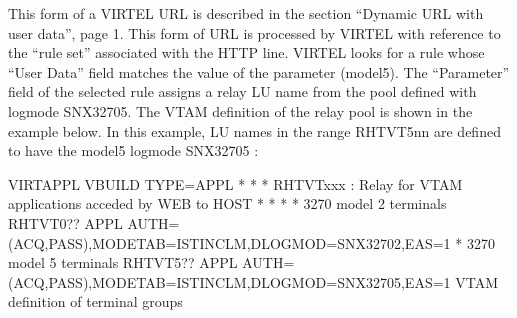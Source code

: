 \documentclass[letterpaper,10pt,english]{sphinxmanual}
\begin{document}
\begin{sphinxVerbatim}[commandchars=\\\{\}]
\end{sphinxVerbatim}

\sphinxAtStartPar
This form of a VIRTEL URL is described in the section “Dynamic URL with user data”, page 1. This form of URL is processed by VIRTEL with reference to the “rule set” associated with the HTTP line. VIRTEL looks for a rule whose “User Data” field matches the value of the parameter (model5). The “Parameter” field of the selected rule assigns a relay LU name from the pool defined with logmode SNX32705. The VTAM definition of the relay pool is shown in the example below. In this example, LU names in the range RHTVT5nn are defined to have the
model5 logmode SNX32705 :\sphinxhyphen{}

\begin{sphinxVerbatim}[commandchars=\\\{\}]
VIRTAPPL VBUILD TYPE=APPL
* \PYGZhy{}\PYGZhy{}\PYGZhy{}\PYGZhy{}\PYGZhy{}\PYGZhy{}\PYGZhy{}\PYGZhy{}\PYGZhy{}\PYGZhy{}\PYGZhy{}\PYGZhy{}\PYGZhy{}\PYGZhy{}\PYGZhy{}\PYGZhy{}\PYGZhy{}\PYGZhy{}\PYGZhy{}\PYGZhy{}\PYGZhy{}\PYGZhy{}\PYGZhy{}\PYGZhy{}\PYGZhy{}\PYGZhy{}\PYGZhy{}\PYGZhy{}\PYGZhy{}\PYGZhy{}\PYGZhy{}\PYGZhy{}\PYGZhy{}\PYGZhy{}\PYGZhy{}\PYGZhy{}\PYGZhy{}\PYGZhy{}\PYGZhy{}\PYGZhy{}\PYGZhy{}\PYGZhy{}\PYGZhy{}\PYGZhy{}\PYGZhy{}\PYGZhy{}\PYGZhy{}\PYGZhy{}\PYGZhy{}\PYGZhy{}\PYGZhy{}\PYGZhy{}\PYGZhy{}\PYGZhy{}\PYGZhy{}\PYGZhy{}\PYGZhy{}\PYGZhy{}\PYGZhy{}\PYGZhy{}\PYGZhy{}\PYGZhy{}\PYGZhy{}\PYGZhy{}\PYGZhy{}\PYGZhy{} *
* RHTVTxxx : Relay for VTAM applications acceded by WEB to HOST *
* \PYGZhy{}\PYGZhy{}\PYGZhy{}\PYGZhy{}\PYGZhy{}\PYGZhy{}\PYGZhy{}\PYGZhy{}\PYGZhy{}\PYGZhy{}\PYGZhy{}\PYGZhy{}\PYGZhy{}\PYGZhy{}\PYGZhy{}\PYGZhy{}\PYGZhy{}\PYGZhy{}\PYGZhy{}\PYGZhy{}\PYGZhy{}\PYGZhy{}\PYGZhy{}\PYGZhy{}\PYGZhy{}\PYGZhy{}\PYGZhy{}\PYGZhy{}\PYGZhy{}\PYGZhy{}\PYGZhy{}\PYGZhy{}\PYGZhy{}\PYGZhy{}\PYGZhy{}\PYGZhy{}\PYGZhy{}\PYGZhy{}\PYGZhy{}\PYGZhy{}\PYGZhy{}\PYGZhy{}\PYGZhy{}\PYGZhy{}\PYGZhy{}\PYGZhy{}\PYGZhy{}\PYGZhy{}\PYGZhy{}\PYGZhy{}\PYGZhy{}\PYGZhy{}\PYGZhy{}\PYGZhy{}\PYGZhy{}\PYGZhy{}\PYGZhy{}\PYGZhy{}\PYGZhy{}\PYGZhy{}\PYGZhy{}\PYGZhy{}\PYGZhy{}\PYGZhy{}\PYGZhy{}\PYGZhy{} *
* 3270 model 2 terminals
RHTVT0?? APPL AUTH=(ACQ,PASS),MODETAB=ISTINCLM,DLOGMOD=SNX32702,EAS=1
* 3270 model 5 terminals
RHTVT5?? APPL AUTH=(ACQ,PASS),MODETAB=ISTINCLM,DLOGMOD=SNX32705,EAS=1
VTAM definition of terminal groups
\end{sphinxVerbatim}
\end{document}
